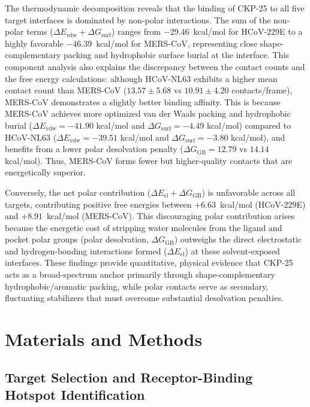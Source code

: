 \documentclass[pharmaceuticals,article,submit,pdftex,moreauthors]{Definitions/mdpi}
\begin{document}
The thermodynamic decomposition reveals that the binding of CKP-25 to all five target interfaces is dominated by non-polar interactions. The sum of the non-polar terms ($\Delta E_{\text{vdw}} + \Delta G_{\text{surf}}$) ranges from $-29.46$~kcal/mol for HCoV-229E to a highly favorable $-46.39$~kcal/mol for MERS-CoV, representing close shape-complementary packing and hydrophobic surface burial at the interface. This component analysis also explains the discrepancy between the contact counts and the free energy calculations: although HCoV-NL63 exhibits a higher mean contact count than MERS-CoV ($13.57 \pm 5.68$ vs $10.91 \pm 4.20$ contacts/frame), MERS-CoV demonstrates a slightly better binding affinity. This is because MERS-CoV achieves more optimized van der Waals packing and hydrophobic burial ($\Delta E_{\text{vdw}} = -41.90$ kcal/mol and $\Delta G_{\text{surf}} = -4.49$ kcal/mol) compared to HCoV-NL63 ($\Delta E_{\text{vdw}} = -39.51$ kcal/mol and $\Delta G_{\text{surf}} = -3.80$ kcal/mol), and benefits from a lower polar desolvation penalty ($\Delta G_{\text{GB}} = 12.79$ vs $14.14$ kcal/mol). Thus, MERS-CoV forms fewer but higher-quality contacts that are energetically superior. 

Conversely, the net polar contribution ($\Delta E_{\text{el}} + \Delta G_{\text{GB}}$) is unfavorable across all targets, contributing positive free energies between $+6.63$~kcal/mol (HCoV-229E) and $+8.91$~kcal/mol (MERS-CoV). This discouraging polar contribution arises because the energetic cost of stripping water molecules from the ligand and pocket polar groups (polar desolvation, $\Delta G_{\text{GB}}$) outweighs the direct electrostatic and hydrogen-bonding interactions formed ($\Delta E_{\text{el}}$) at these solvent-exposed interfaces. These findings provide quantitative, physical evidence that CKP-25 acts as a broad-spectrum anchor primarily through shape-complementary hydrophobic/aromatic packing, while polar contacts serve as secondary, fluctuating stabilizers that must overcome substantial desolvation penalties.

\section{Materials and Methods}

\subsection{Target Selection and Receptor-Binding Hotspot Identification}
\label{sec:target_selection}
\end{document}
